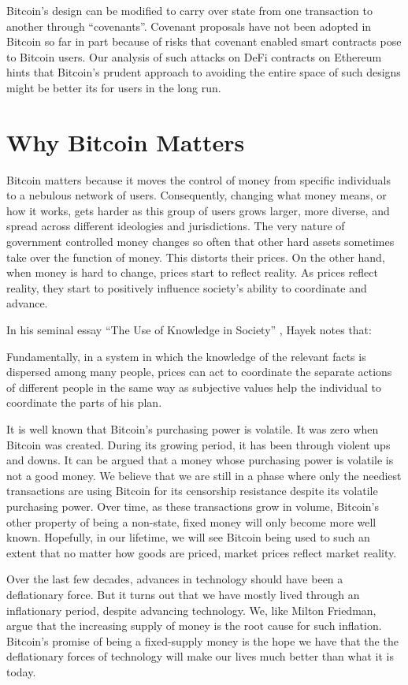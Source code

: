 Bitcoin's design can be modified to carry over state from one transaction to another through ``covenants''. Covenant proposals have not been adopted in Bitcoin so far in part because of risks that covenant enabled smart contracts pose to Bitcoin users. Our analysis of such attacks on DeFi contracts on Ethereum hints that Bitcoin's prudent approach to avoiding the entire space of such designs might be better its for users in the long run.

\section{Why Bitcoin Matters}
Bitcoin matters because it moves the control of money from specific individuals to a nebulous network of users. Consequently, changing what money means, or how it works, gets harder as this group of users grows larger, more diverse, and spread across different ideologies and jurisdictions. The very nature of government controlled money changes so often that other hard assets sometimes take over the function of money. This distorts their prices. On the other hand, when money is hard to change, prices start to reflect reality. As prices reflect reality, they start to positively influence society's ability to coordinate and advance.

In his seminal essay ``The Use of Knowledge in Society'' \cite{Hayek_AER45}, Hayek notes that:
\begin{displayquote}
Fundamentally, in a system in which the knowledge of the relevant facts is dispersed among many people, prices can act to coordinate the separate actions of different people in the same way as subjective values help the individual to coordinate the parts of his plan.
\end{displayquote}

It is well known that Bitcoin's purchasing power is volatile. It was zero when Bitcoin was created. During its growing period, it has been through violent ups and downs. It can be argued that a money whose purchasing power is volatile is not a good money. We believe that we are still in a phase where only the neediest transactions are using Bitcoin for its censorship resistance despite its volatile purchasing power. Over time, as these transactions grow in volume, Bitcoin's other property of being a non-state, fixed money will only become more well known. Hopefully, in our lifetime, we will see Bitcoin being used to such an extent that no matter how goods are priced, market prices reflect market reality.

Over the last few decades, advances in technology should have been a deflationary force. But it turns out that we have mostly lived through an inflationary period, despite advancing technology. We, like Milton Friedman, argue that the increasing supply of money is the root cause for such inflation. Bitcoin's promise of being a fixed-supply money is the hope we have that the the deflationary forces of technology will make our lives much better than what it is today.